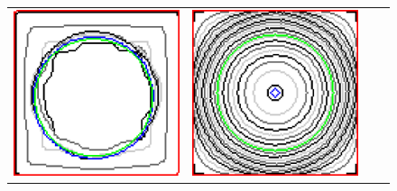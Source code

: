 \begin{figure}
\begin{tabular}{cccc}
\includegraphics[scale=0.15]{figures/chapter9/free-elastica/localsearch/square/len_pen-0.01/radius-7/summary.pdf} & 
\includegraphics[scale=0.15]{figures/chapter9/free-elastica/flipflow/square/len_pen-0.01/radius-7/summary.pdf} &

\end{tabular}
\end{figure}
